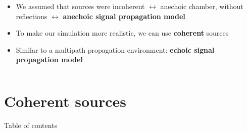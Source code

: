 \documentclass[UKenglish,8pt,aspectratio=1610]{beamer}
\begin{document}
\begin{frame}
\begin{columns}
\begin{column}{0.5\textwidth}
\begin{table}[h!]
		\end{table}
	\begin{itemize}
		\item We assumed that sources were incoherent $\longleftrightarrow$ anechoic chamber, without reflections $\longleftrightarrow$ \textbf{anechoic signal propagation model}
		\item To make our simulation more realistic, we can use \textbf{coherent} sources
		\item Similar to a multipath propagation environment: \textbf{echoic signal propagation model}
	\end{itemize}
		\end{column}
	\end{columns} 
\end{frame}
	\section{Coherent sources }
	\begin{frame}{Table of contents}
	\tableofcontents[currentsection]
\end{frame}
\end{document}
